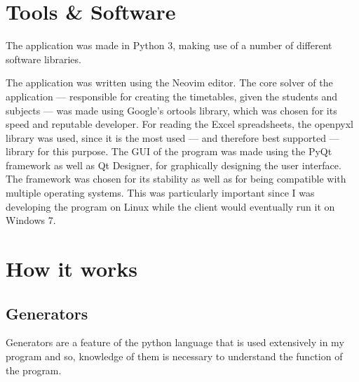\documentclass[12pt]{article}
\begin{document}
\section{Tools \& Software}
\label{sec:tools_and_software}

The application was made in Python 3, making use of a number of different software
libraries.  

The application was written using the Neovim \autocite{neovim} editor. The core solver of
the application --- responsible for creating the timetables, given the students and subjects
--- was made using Google's ortools \autocite{ortools} library, which was chosen for its
speed and reputable developer.  For reading the Excel spreadsheets, the
openpyxl\autocite{openpyxl} library was used, since it is the most used --- and therefore
best supported --- library for this purpose. The GUI of the program was made using the PyQt
\autocite{pyqt} framework as well as Qt Designer\autocite{qtdesigner}, for graphically
designing the user interface. The framework was chosen for its stability as well as for
being compatible with multiple operating systems. This was particularly important since I
was developing the program on Linux while the client would eventually run it on Windows 7.


\section{How it works}

\subsection{Generators}
Generators are a feature of the python language that is used extensively in my program and
so, knowledge of them is necessary to understand the function of the program. 
\end{document}
